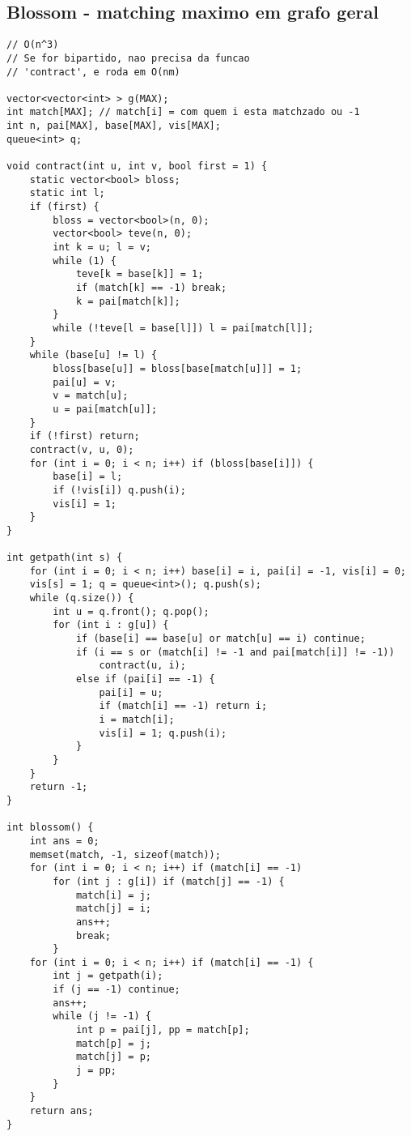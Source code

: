 \documentclass[12pt, a4paper, twoside]{article}
\begin{document}
\subsection{Blossom - matching maximo em grafo geral}
\begin{lstlisting}
// O(n^3)
// Se for bipartido, nao precisa da funcao
// 'contract', e roda em O(nm)

vector<vector<int> > g(MAX);
int match[MAX]; // match[i] = com quem i esta matchzado ou -1
int n, pai[MAX], base[MAX], vis[MAX];
queue<int> q;
 
void contract(int u, int v, bool first = 1) {
    static vector<bool> bloss;
    static int l;
    if (first) {
        bloss = vector<bool>(n, 0);
        vector<bool> teve(n, 0);
        int k = u; l = v;
        while (1) {
            teve[k = base[k]] = 1;
            if (match[k] == -1) break;
            k = pai[match[k]];
        }
        while (!teve[l = base[l]]) l = pai[match[l]];
    }
    while (base[u] != l) {
        bloss[base[u]] = bloss[base[match[u]]] = 1;
        pai[u] = v;
        v = match[u];
        u = pai[match[u]];
    }
    if (!first) return;
    contract(v, u, 0);
    for (int i = 0; i < n; i++) if (bloss[base[i]]) {
        base[i] = l;
        if (!vis[i]) q.push(i);
        vis[i] = 1;
    }
}
 
int getpath(int s) {
    for (int i = 0; i < n; i++) base[i] = i, pai[i] = -1, vis[i] = 0;
    vis[s] = 1; q = queue<int>(); q.push(s);
    while (q.size()) {
        int u = q.front(); q.pop();
        for (int i : g[u]) {
            if (base[i] == base[u] or match[u] == i) continue;
            if (i == s or (match[i] != -1 and pai[match[i]] != -1))
                contract(u, i);
            else if (pai[i] == -1) {
                pai[i] = u;
                if (match[i] == -1) return i;
                i = match[i];
                vis[i] = 1; q.push(i);
            }
        }
    }
    return -1;
}
 
int blossom() {
    int ans = 0;
    memset(match, -1, sizeof(match));
    for (int i = 0; i < n; i++) if (match[i] == -1)
        for (int j : g[i]) if (match[j] == -1) {
            match[i] = j;
            match[j] = i;
            ans++;
            break;
        }
    for (int i = 0; i < n; i++) if (match[i] == -1) {
        int j = getpath(i);
        if (j == -1) continue;
        ans++;
        while (j != -1) {
            int p = pai[j], pp = match[p];
            match[p] = j;
            match[j] = p;
            j = pp;
        }
    }
    return ans;
}
\end{lstlisting}
\end{document}
